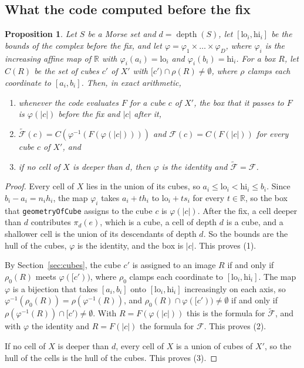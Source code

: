 \documentclass[11pt]{article}
\theoremstyle{plain}
\newtheorem{proposition}{Proposition}[section]
\theoremstyle{definition}
\theoremstyle{remark}
\DeclareMathOperator{\depth}{depth}
\newcommand{\R}{\mathbb{R}}
\newcommand{\Fc}{\mathcal{F}}
\newcommand{\Ft}{\tilde{\mathcal{F}}}
\newcommand{\lo}{\mathrm{lo}}
\newcommand{\hi}{\mathrm{hi}}
\newcommand{\code}[1]{\texttt{#1}}
\begin{document}
\subsection{What the code computed before the fix}\label{sec:old}

\begin{proposition}\label{prop:old}
Let $S$ be a Morse set and $d=\depth(S)$, let $[\lo_i,\hi_i]$ be the bounds of the complex before the fix, and let $\varphi=\varphi_1\times\dots\times\varphi_D$, where $\varphi_i$ is the increasing affine map of $\R$ with $\varphi_i(a_i)=\lo_i$ and $\varphi_i(b_i)=\hi_i$. For a box $R$, let $C(R)$ be the set of cubes $c'$ of $X'$ with $[c')\cap\rho(R)\neq\emptyset$, where $\rho$ clamps each coordinate to $[a_i,b_i]$. Then, in exact arithmetic,
\begin{enumerate}[label=(\arabic*)]
\item whenever the code evaluates $F$ for a cube $c$ of $X'$, the box that it passes to $F$ is $\varphi(|c|)$ before the fix and $|c|$ after it,
\item $\Ft(c)=C\left(\varphi^{-1}(F(\varphi(|c|)))\right)$ and $\Fc(c)=C(F(|c|))$ for every cube $c$ of $X'$, and
\item if no cell of $X$ is deeper than $d$, then $\varphi$ is the identity and $\Ft=\Fc$.
\end{enumerate}
\end{proposition}

\begin{proof}
Every cell of $X$ lies in the union of its cubes, so $a_i\leq\lo_i<\hi_i\leq b_i$. Since $b_i-a_i=n_ih_i$, the map $\varphi_i$ takes $a_i+th_i$ to $\lo_i+ts_i$ for every $t\in\R$, so the box that \code{geometryOfCube} assigns to the cube $c$ is $\varphi(|c|)$. After the fix, a cell deeper than $d$ contributes $\pi_d(e)$, which is a cube, a cell of depth $d$ is a cube, and a shallower cell is the union of its descendants of depth $d$. So the bounds are the hull of the cubes, $\varphi$ is the identity, and the box is $|c|$. This proves (1).

By Section~\ref{sec:cubes}, the cube $c'$ is assigned to an image $R$ if and only if $\rho_0(R)$ meets $\varphi([c'))$, where $\rho_0$ clamps each coordinate to $[\lo_i,\hi_i]$. The map $\varphi$ is a bijection that takes $[a_i,b_i]$ onto $[\lo_i,\hi_i]$ increasingly on each axis, so $\varphi^{-1}(\rho_0(R))=\rho(\varphi^{-1}(R))$, and $\rho_0(R)\cap\varphi([c'))\neq\emptyset$ if and only if $\rho(\varphi^{-1}(R))\cap[c')\neq\emptyset$. With $R=F(\varphi(|c|))$ this is the formula for $\Ft$, and with $\varphi$ the identity and $R=F(|c|)$ the formula for $\Fc$. This proves (2).

If no cell of $X$ is deeper than $d$, every cell of $X$ is a union of cubes of $X'$, so the hull of the cells is the hull of the cubes. This proves (3).
\end{proof}
\end{document}
